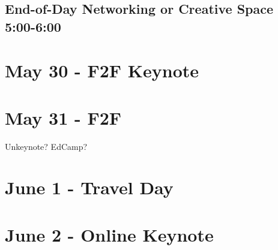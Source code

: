 \documentclass[
]{book}
\begin{document}
\hypertarget{end-of-day-networking-or-creative-space-500-600}{%
\section*{End-of-Day Networking or Creative Space \textbar{} 5:00-6:00}\label{end-of-day-networking-or-creative-space-500-600}}

\hypertarget{may-30---f2f-keynote}{%
\chapter{May 30 - F2F Keynote}\label{may-30---f2f-keynote}}

\hypertarget{may-31---f2f}{%
\chapter{May 31 - F2F}\label{may-31---f2f}}

Unkeynote? EdCamp?

\hypertarget{june-1---travel-day}{%
\chapter{June 1 - Travel Day}\label{june-1---travel-day}}

\hypertarget{june-2---online-keynote}{%
\chapter{June 2 - Online Keynote}\label{june-2---online-keynote}}

  
\end{document}
